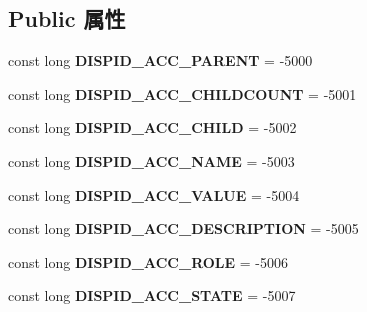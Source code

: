 \subsection*{Public 属性}
\begin{DoxyCompactItemize}
\item 
\mbox{\label{interface_i_accessible_a35711086eace4219f5b7e0de414871be}} 
const long {\bfseries D\+I\+S\+P\+I\+D\+\_\+\+A\+C\+C\+\_\+\+P\+A\+R\+E\+NT} = -\/5000
\item 
\mbox{\label{interface_i_accessible_ad7a11296ed1dcac85139aa32f99611df}} 
const long {\bfseries D\+I\+S\+P\+I\+D\+\_\+\+A\+C\+C\+\_\+\+C\+H\+I\+L\+D\+C\+O\+U\+NT} = -\/5001
\item 
\mbox{\label{interface_i_accessible_aa66683aab371a5027a3f88e6f7d69226}} 
const long {\bfseries D\+I\+S\+P\+I\+D\+\_\+\+A\+C\+C\+\_\+\+C\+H\+I\+LD} = -\/5002
\item 
\mbox{\label{interface_i_accessible_ac4af5e56b4696edb4634e9edecdc1c2c}} 
const long {\bfseries D\+I\+S\+P\+I\+D\+\_\+\+A\+C\+C\+\_\+\+N\+A\+ME} = -\/5003
\item 
\mbox{\label{interface_i_accessible_aa21b862dce46dfe55f7097325bf27d02}} 
const long {\bfseries D\+I\+S\+P\+I\+D\+\_\+\+A\+C\+C\+\_\+\+V\+A\+L\+UE} = -\/5004
\item 
\mbox{\label{interface_i_accessible_acf738463334e45549bbb40577c743b90}} 
const long {\bfseries D\+I\+S\+P\+I\+D\+\_\+\+A\+C\+C\+\_\+\+D\+E\+S\+C\+R\+I\+P\+T\+I\+ON} = -\/5005
\item 
\mbox{\label{interface_i_accessible_adbb3676f8e63ec545ddea216a5639e8f}} 
const long {\bfseries D\+I\+S\+P\+I\+D\+\_\+\+A\+C\+C\+\_\+\+R\+O\+LE} = -\/5006
\item 
\mbox{\label{interface_i_accessible_ad730a25144e89dcf6099189bdd1fd40a}} 
const long {\bfseries D\+I\+S\+P\+I\+D\+\_\+\+A\+C\+C\+\_\+\+S\+T\+A\+TE} = -\/5007
\item 
\mbox{\label{interface_i_accessible_af27c8651952cd9e7375600fae186cb86}} 

\end{DoxyCompactItemize}

